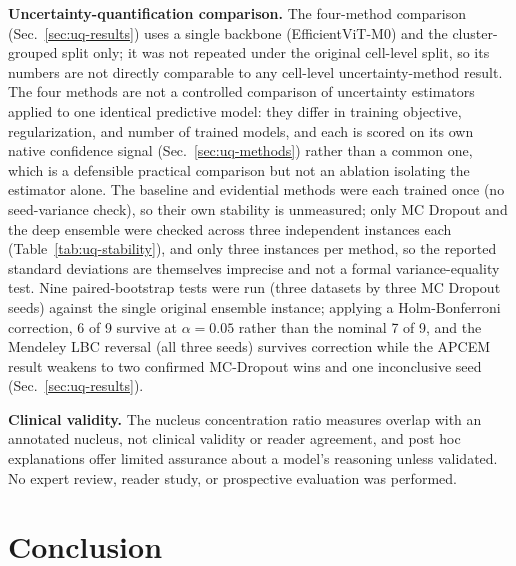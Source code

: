 \documentclass[12pt,letterpaper]{article}
\begin{document}
\textbf{Uncertainty-quantification comparison.} The four-method comparison (Sec.~\ref{sec:uq-results}) uses a single backbone (EfficientViT-M0) and the cluster-grouped split only; it was not repeated under the original cell-level split, so its numbers are not directly comparable to any cell-level uncertainty-method result. The four methods are not a controlled comparison of uncertainty estimators applied to one identical predictive model: they differ in training objective, regularization, and number of trained models, and each is scored on its own native confidence signal (Sec.~\ref{sec:uq-methods}) rather than a common one, which is a defensible practical comparison but not an ablation isolating the estimator alone. The baseline and evidential methods were each trained once (no seed-variance check), so their own stability is unmeasured; only MC Dropout and the deep ensemble were checked across three independent instances each (Table~\ref{tab:uq-stability}), and only three instances per method, so the reported standard deviations are themselves imprecise and not a formal variance-equality test. Nine paired-bootstrap tests were run (three datasets by three MC Dropout seeds) against the single original ensemble instance; applying a Holm-Bonferroni correction, 6 of 9 survive at $\alpha=0.05$ rather than the nominal 7 of 9, and the Mendeley LBC reversal (all three seeds) survives correction while the APCEM result weakens to two confirmed MC-Dropout wins and one inconclusive seed (Sec.~\ref{sec:uq-results}).

\textbf{Clinical validity.} The nucleus concentration ratio measures overlap with an annotated nucleus, not clinical validity or reader agreement, and post hoc explanations offer limited assurance about a model's reasoning unless validated.\cite{ghassemi2021} No expert review, reader study, or prospective evaluation was performed.

\section{Conclusion}
\label{sec:conclusion}
\end{document}
